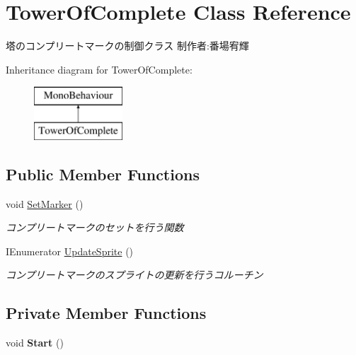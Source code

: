 \hypertarget{class_tower_of_complete}{}\section{Tower\+Of\+Complete Class Reference}
\label{class_tower_of_complete}


塔のコンプリートマークの制御クラス 制作者\+:番場宥輝  


Inheritance diagram for Tower\+Of\+Complete\+:\begin{figure}[H]
\begin{center}
\leavevmode
\includegraphics[height=2.000000cm]{class_tower_of_complete}
\end{center}
\end{figure}
\subsection*{Public Member Functions}
\begin{DoxyCompactItemize}
\item 
void \hyperlink{class_tower_of_complete_a1930d50f706179ad260ced8553549a15}{Set\+Marker} ()
\begin{DoxyCompactList}\small\item\em コンプリートマークのセットを行う関数 \end{DoxyCompactList}\item 
I\+Enumerator \hyperlink{class_tower_of_complete_a1d5f5ea3a931026a6d3eb25cd3055be2}{Update\+Sprite} ()
\begin{DoxyCompactList}\small\item\em コンプリートマークのスプライトの更新を行うコルーチン \end{DoxyCompactList}\end{DoxyCompactItemize}
\subsection*{Private Member Functions}
\begin{DoxyCompactItemize}
\item 
\mbox{\label{class_tower_of_complete_aabe1b89882bd0edb1bfcf5a952605e58}} 
void {\bfseries Start} ()
\end{DoxyCompactItemize}
